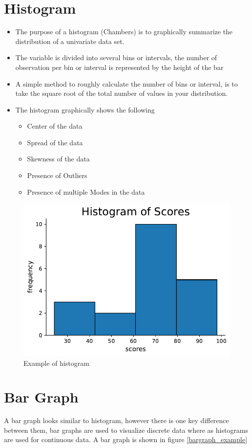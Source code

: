 \documentclass[twoside,12pt]{report}  %
\begin{document}
\section{Histogram}
\begin{itemize}
	\item The purpose of a histogram (Chambers) is to graphically summarize the distribution of a univariate data set.
	\item The variable is divided into several bins or intervals, the number of observation per bin or interval is represented by the height of the bar
	\item A simple method to roughly calculate the number of bins or interval, is to take the square root of the total number of values in your distribution.
	\item The histogram graphically shows the following
	\begin{itemize}
		\item Center of the data
		\item Spread of the data
		\item Skewness of the data
		\item Presence of Outliers
		\item Presence of multiple Modes in the data 
	\end{itemize}
\end{itemize}

\begin{figure}[H]
	\centering
	\includegraphics[width=0.5\linewidth]{./images/histogram_example.pdf}
	\caption{Example of histogram}
	\label{histogram_example}
\end{figure}

\vfill
\pagebreak
\section{Bar Graph}

A bar graph looks similar to histogram, however there is one key difference between them, bar graphs are used to visualize discrete data where as histograms are used for continuous data. A bar graph is shown in figure \ref{bargraph_example}
\end{document}
